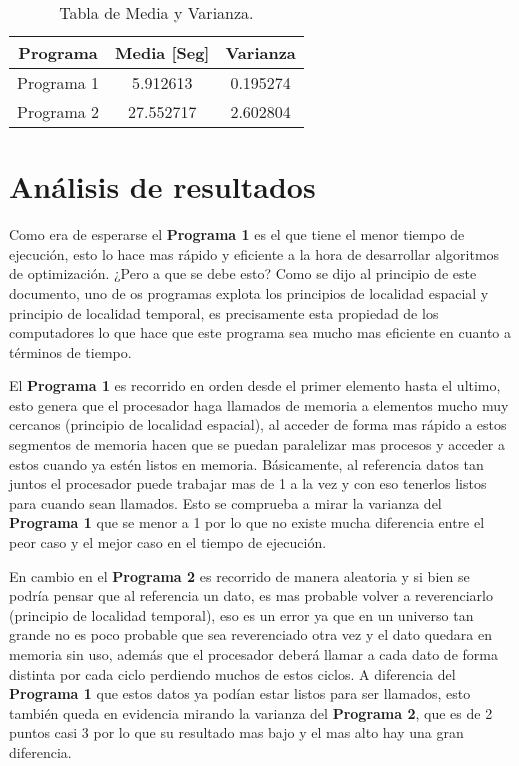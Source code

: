 \documentclass{article}
\begin{document}
\begin{table}[htbp]
    \begin{center}
    \begin{tabular}{|c|c|c|}
    \hline
    \textbf{Programa} & \textbf{Media [Seg]}&\textbf{Varianza}\\ \hline
    Programa 1  & 5.912613    & 0.195274    \\ \hline
    Programa 2  & 27.552717  & 2.602804  	\\ \hline
    \end{tabular}
    \caption{Tabla de Media y Varianza.}
    \label{tabla:sencilla2}
    \end{center}
\end{table}

    \newpage

\section{Análisis de resultados}
	
    Como era de esperarse el \textbf{Programa 1} es el que tiene el menor tiempo de ejecución, esto lo hace mas rápido y eficiente a la hora de desarrollar algoritmos de optimización. ¿Pero a que se debe esto? Como se dijo al principio de este documento, uno de os programas explota los principios de localidad espacial y principio de localidad temporal, es precisamente esta propiedad de los computadores lo que hace que este programa sea mucho mas eficiente en cuanto a términos de tiempo.

    El \textbf{Programa 1} es recorrido en orden desde el primer elemento hasta el ultimo, esto genera que el procesador haga llamados de memoria a elementos mucho muy cercanos (principio de localidad espacial), al acceder de forma mas rápido a estos segmentos de memoria hacen que se puedan paralelizar mas procesos y acceder a estos cuando ya estén listos en memoria. Básicamente, al referencia datos tan juntos el procesador puede trabajar mas de 1 a la vez y con eso tenerlos listos para cuando sean llamados. Esto se comprueba a mirar la varianza del \textbf{Programa 1} que se menor a 1 por lo que no existe mucha diferencia entre el peor caso y el mejor caso en el tiempo de ejecución.

    En cambio en el \textbf{Programa 2} es recorrido de manera aleatoria y si bien se podría pensar que al referencia un dato, es mas probable volver a reverenciarlo (principio de localidad temporal), eso es un error ya que en un universo tan grande no es poco probable que sea reverenciado otra vez y el dato quedara en memoria sin uso, además que el procesador deberá llamar a cada dato de forma distinta por cada ciclo perdiendo muchos de estos ciclos. A diferencia del \textbf{Programa 1} que estos datos ya podían estar listos para ser llamados, esto también queda en evidencia mirando la varianza del \textbf{Programa 2}, que es de 2 puntos casi 3 por lo que su resultado mas bajo y el mas alto hay una gran diferencia.
    
\end{document}
